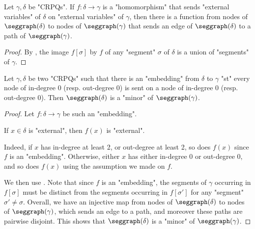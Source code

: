 \begin{lemma}
	\AP\label{lemma:hom-segments}
	Let $\gamma,\delta$ be "CRPQs".
	If $f\colon \delta \to \gamma$ is a "homomorphism" that sends "external variables"
	of $\delta$ on "external variables" of $\gamma$, then there is a
	function from nodes of $\seggraph(\delta)$ to nodes of $\seggraph(\gamma)$  
	that sends an edge of $\seggraph(\delta)$ to a path of $\seggraph(\gamma)$.
\end{lemma}

\begin{proof}
	By , the image
	$f[\sigma]$ by $f$ of any "segment" $\sigma$ of $\delta$ is a union of
	"segments" of $\gamma$.
\end{proof}

\begin{corollary}
	\AP\label{coro:embedding-segments}
	Let $\gamma, \delta$ be two "CRPQs" such that there is an "embedding" from $\delta$ to $\gamma$
	"st" every node of in-degree 0 (resp. out-degree 0) is sent on a node of in-degree 0
	(resp. out-degree 0). 
	Then $\seggraph(\delta)$ is a "minor" of $\seggraph(\gamma)$.
\end{corollary}

\begin{proof}
	Let $f\colon \delta \to \gamma$ be such an "embedding".
	\begin{claim}
		\AP\label{claim:hom-preserves-non-internality}
		If $x \in \delta$ is "external", then $f(x)$ is "external".
	\end{claim}
	Indeed, if $x$ has in-degree at least 2, or out-degree at least 2,
	so does $f(x)$ since $f$ is an "embedding".
	Otherwise, either $x$ has either in-degree 0 or out-degree 0,
	and so does $f(x)$ using the assumption we made on $f$.

	We then use .
	Note that since $f$ is an "embedding", the segments of $\gamma$ occurring in
	$f[\sigma]$ must be distinct from the segments occurring in $f[\sigma']$
	for any "segment" $\sigma' \neq \sigma$.
	Overall, we have an injective map from nodes of $\seggraph(\delta)$ 
	to nodes of $\seggraph(\gamma)$, which sends an edge to a path,
	and moreover these paths are pairwise disjoint.
	This shows that $\seggraph(\delta)$ is a "minor" of $\seggraph(\gamma)$.
\end{proof}

